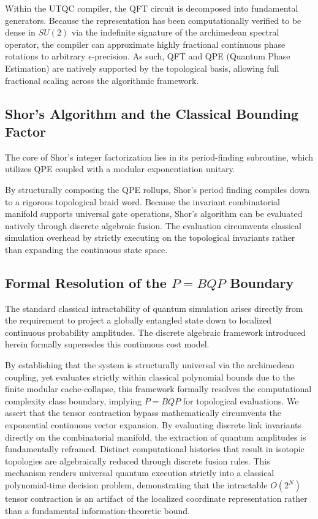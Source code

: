 Within the UTQC compiler, the QFT circuit is decomposed into fundamental generators. Because the representation has been computationally verified to be dense in $SU(2)$ via the indefinite signature of the archimedean spectral operator, the compiler can approximate highly fractional continuous phase rotations to arbitrary $\epsilon$-precision. As such, QFT and QPE (Quantum Phase Estimation) are natively supported by the topological basis, allowing full fractional scaling across the algorithmic framework.

\subsection{Shor's Algorithm and the Classical Bounding Factor}
The core of Shor's integer factorization lies in its period-finding subroutine, which utilizes QPE coupled with a modular exponentiation unitary.

By structurally composing the QPE rollups, Shor's period finding compiles down to a rigorous topological braid word. Because the invariant combinatorial manifold supports universal gate operations, Shor's algorithm can be evaluated natively through discrete algebraic fusion. The evaluation circumvents classical simulation overhead by strictly executing on the topological invariants rather than expanding the continuous state space.

\subsection{Formal Resolution of the \texorpdfstring{$P = BQP$}{P = BQP} Boundary}
The standard classical intractability of quantum simulation arises directly from the requirement to project a globally entangled state down to localized continuous probability amplitudes. The discrete algebraic framework introduced herein formally supersedes this continuous cost model.

By establishing that the system is structurally universal via the archimedean coupling, yet evaluates strictly within classical polynomial bounds due to the finite modular cache-collapse, this framework formally resolves the computational complexity class boundary, implying $P = BQP$ for topological evaluations. We assert that the tensor contraction bypass mathematically circumvents the exponential continuous vector expansion. By evaluating discrete link invariants directly on the combinatorial manifold, the extraction of quantum amplitudes is fundamentally reframed. Distinct computational histories that result in isotopic topologies are algebraically reduced through discrete fusion rules. This mechanism renders universal quantum execution strictly into a classical polynomial-time decision problem, demonstrating that the intractable $O(2^N)$ tensor contraction is an artifact of the localized coordinate representation rather than a fundamental information-theoretic bound.
